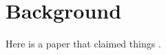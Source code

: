 \documentclass[../main.tex]{subfiles}
\begin{document}
\chapter{Background}

Here is a paper that claimed things \cite{wu_gpucc_2016}.
\end{document}
